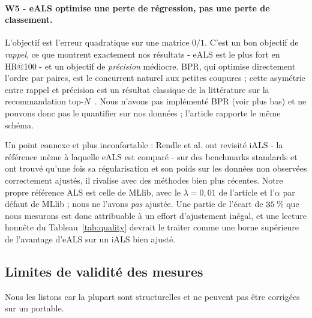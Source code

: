 \paragraph{W5 - eALS optimise une perte de régression, pas une perte de
classement.} L'objectif est l'erreur quadratique sur une matrice $0/1$. C'est un bon
objectif de \emph{rappel}, ce que montrent exactement nos résultats - eALS est le
plus fort en HR@100 - et un objectif de \emph{précision} médiocre. BPR, qui
optimise directement l'ordre par paires, est le concurrent naturel aux petites
coupures ; cette asymétrie entre rappel et précision est un résultat classique de la
littérature sur la recommandation top-$N$~\cite{cremonesi2010topn}. Nous n'avons pas implémenté BPR (voir plus
bas) et ne pouvons donc pas le quantifier sur nos données ; l'article rapporte le même
schéma.

Un point connexe et plus inconfortable : Rendle et al. ont
revisité iALS - la référence même à laquelle eALS est comparé - sur des
benchmarks standards et ont trouvé qu'une fois sa régularisation et son poids sur les
données non observées correctement ajustés, il rivalise avec des méthodes bien plus
récentes. Notre propre référence ALS est celle de MLlib, avec le $\lambda=0,01$ de
l'article et l'$\alpha$ par défaut de MLlib ; nous ne l'avons \emph{pas} ajustée. Une
partie de l'écart de $35$\,\% que nous mesurons est donc attribuable à un
effort d'ajustement inégal, et une lecture honnête du Tableau~\ref{tab:quality}
devrait le traiter comme une borne supérieure de l'avantage d'eALS sur un iALS bien
ajusté.

\subsection{Limites de validité des mesures}

Nous les listons car la plupart sont structurelles et ne peuvent pas être corrigées
sur un portable.

